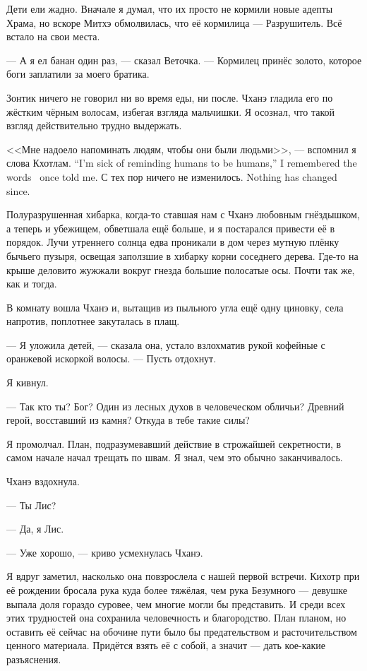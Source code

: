 Дети ели жадно.
Вначале я думал, что их просто не кормили новые адепты Храма, но вскоре Митхэ обмолвилась, что её кормилица --- Разрушитель.
Всё встало на свои места.

--- А я ел банан один раз, --- сказал Веточка.
--- Кормилец принёс золото, которое боги заплатили за моего братика.

Зонтик ничего не говорил ни во время еды, ни после.
Чханэ гладила его по жёстким чёрным волосам, избегая взгляда мальчишки.
Я осознал, что такой взгляд действительно трудно выдержать.

{<<Мне надоело напоминать людям, чтобы они были людьми>>, --- вспомнил я слова Кхотлам.}
{``I'm sick of reminding humans to be humans,'' I remembered the words \Kchotlam\ once told me.}
{С тех пор ничего не изменилось.}
{Nothing has changed since.}

Полуразрушенная хибарка, когда-то ставшая нам с Чханэ любовным гнёздышком, а теперь и убежищем, обветшала ещё больше, и я постарался привести её в порядок.
Лучи утреннего солнца едва проникали в дом через мутную плёнку бычьего пузыря, освещая заползшие в хибарку корни соседнего дерева.
Где-то на крыше деловито жужжали вокруг гнезда большие полосатые осы.
Почти так же, как и тогда.

В комнату вошла Чханэ и, вытащив из пыльного угла ещё одну циновку, села напротив, поплотнее закуталась в плащ.

--- Я уложила детей, --- сказала она, устало взлохматив рукой кофейные с оранжевой искоркой волосы.
--- Пусть отдохнут.

Я кивнул.

--- Так кто ты?
Бог?
Один из лесных духов в человеческом обличьи?
Древний герой, восставший из камня?
Откуда в тебе такие силы?

Я промолчал.
План, подразумевавший действие в строжайшей секретности, в самом начале начал трещать по швам.
Я знал, чем это обычно заканчивалось.

Чханэ вздохнула.

--- Ты Лис?

--- Да, я Лис.

--- Уже хорошо, --- криво усмехнулась Чханэ.

Я вдруг заметил, насколько она повзрослела с нашей первой встречи.
Кихотр при её рождении бросала рука куда более тяжёлая, чем рука Безумного --- девушке выпала доля гораздо суровее, чем многие могли бы представить.
И среди всех этих трудностей она сохранила человечность и благородство.
План планом, но оставить её сейчас на обочине пути было бы предательством и расточительством ценного материала.
Придётся взять её с собой, а значит --- дать кое-какие разъяснения.

